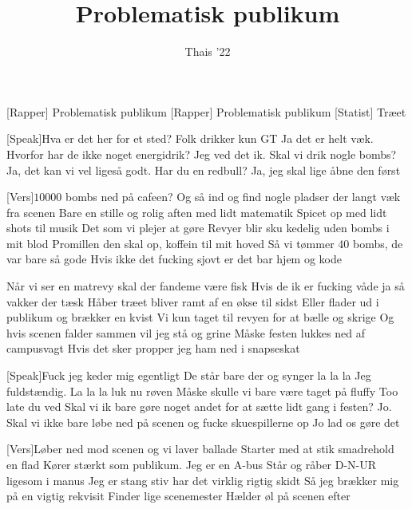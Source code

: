 \documentclass[a4paper,11pt]{article}
\title{Problematisk publikum}
\author{Thais '22}
\begin{document}
\maketitle

\begin{roles}
[Rapper] Problematisk publikum
[Rapper] Problematisk publikum
[Statist] Træet 
\end{roles}

\begin{song}
[Speak]Hva er det her for et sted? Folk drikker kun GT
Ja det er helt væk. Hvorfor har de ikke noget energidrik?
Jeg ved det ik. Skal vi drik nogle bombs?
Ja, det kan vi vel ligeså godt. Har du en redbull?
Ja, jeg skal lige åbne den først

[Vers]$10000$ bombs ned på cafeen? 
Og så ind og find nogle pladser der langt væk fra scenen 
Bare en stille og rolig aften med lidt matematik
Spicet op med lidt shots til musik
Det som vi plejer at gøre
Revyer blir sku kedelig uden bombs i mit blod
Promillen den skal op, koffein til mit hoved
Så vi tømmer 40 bombs, de var bare så gode
Hvis ikke det fucking sjovt er det bar hjem og kode

Når vi ser en matrevy skal der fandeme være fisk
Hvis de ik er fucking våde ja så vakker der tæsk 
Håber træet bliver ramt af en økse til sidst
Eller flader ud i publikum og brækker en kvist
Vi kun taget til revyen for at bælle og skrige
Og hvis scenen falder sammen vil jeg stå og grine
Måske festen lukkes ned af campusvagt
Hvis det sker propper jeg ham ned i snapseskat

[Speak]Fuck jeg keder mig egentligt
De står bare der og synger la la la
Jeg fuldstændig. La la la luk nu røven
Måske skulle vi bare være taget på fluffy 
Too late du ved
Skal vi ik bare gøre noget andet for at sætte lidt gang i festen?
Jo. 
Skal vi ikke bare løbe ned på scenen og fucke skuespillerne op
Jo lad os gøre det

[Vers]Løber ned mod scenen og vi laver ballade
Starter med at stik smadrehold en flad 
Kører stærkt som publikum. Jeg er en A-bus 
Står og råber D-N-UR ligesom i manus 
Jeg er stang stiv har det virklig rigtig skidt
Så jeg brækker mig på en vigtig rekvisit
Finder lige scenemester 
Hælder øl på scenen efter 


\end{song}
\end{document}

